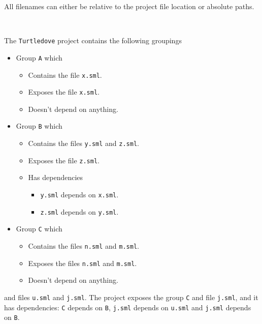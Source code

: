 All filenames can either be relative to the project file location or absolute
paths.


\begin{example}\ 
  \label{ex:Sample-project-file-turtledove}
  
  The \texttt{Turtledove} project contains the following groupings
  
  \begin{itemize}
  \item Group \texttt{A} which
    \begin{itemize}
    \item Contains the file \texttt{x.sml}.
    \item Exposes the file \texttt{x.sml}.
    \item Doesn't depend on anything.
    \end{itemize}
    
  \item Group \texttt{B} which
    \begin{itemize}
    \item Contains the files \texttt{y.sml} and \texttt{z.sml}.
    \item Exposes the file \texttt{z.sml}.
    \item Has dependencies
      \begin{itemize}
      \item \texttt{y.sml} depends on \texttt{x.sml}.
      \item \texttt{z.sml} depends on \texttt{y.sml}.
      \end{itemize}
    \end{itemize}
    
  \item Group \texttt{C} which
    \begin{itemize}
    \item Contains the files \texttt{n.sml} and \texttt{m.sml}.
    \item Exposes the files \texttt{n.sml} and \texttt{m.sml}.
    \item Doesn't depend on anything.
    \end{itemize}
  \end{itemize}
  
  and files \texttt{u.sml} and \texttt{j.sml}. The project exposes the group
  \texttt{C} and file \texttt{j.sml}, and it has dependencies: \texttt{C}
  depends on \texttt{B}, \texttt{j.sml} depends on \texttt{u.sml} and
  \texttt{j.sml} depends on \texttt{B}.
  

\end{example}
